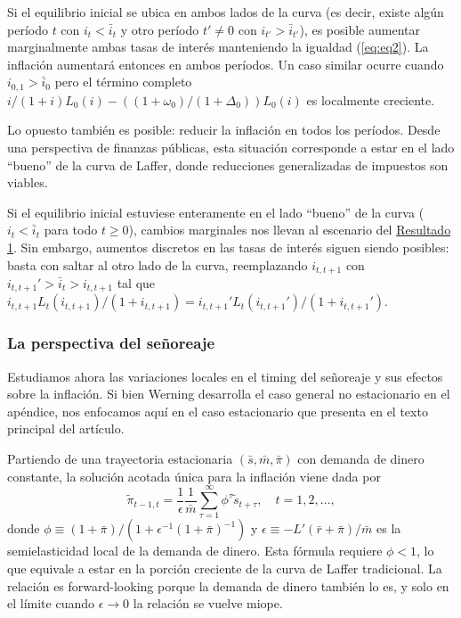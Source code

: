\documentclass[../../entrega.tex]{subfiles}
\begin{document}
Si el equilibrio inicial se ubica en ambos lados de la curva (es decir, existe algún período $t$ con $i_t < \bar{i}_t$ y otro período $t' \neq 0$ con $i_{t'} > \bar{i}_{t'}$), es posible aumentar marginalmente ambas tasas de interés manteniendo la igualdad (\ref{eq:eq2}).
La inflación aumentará entonces en ambos períodos.
Un caso similar ocurre cuando $i_{0,1} > \bar{i}_0$ pero el término completo $i/(1 + i)L_0(i) - ((1 + \omega_0)/(1 + \Delta_0))L_0(i)$ es localmente creciente.

Lo opuesto también es posible: reducir la inflación en todos los períodos.
Desde una perspectiva de finanzas públicas, esta situación corresponde a estar en el lado ``bueno'' de la curva de Laffer, donde reducciones generalizadas de impuestos son viables.

Si el equilibrio inicial estuviese enteramente en el lado ``bueno'' de la curva ($i_t < \bar{i}_t$ para todo $t \geq 0$), cambios marginales nos llevan al escenario del \hyperref[par:result1]{Resultado 1}.
Sin embargo, aumentos discretos en las tasas de interés siguen siendo posibles: basta con saltar al otro lado de la curva, reemplazando $i_{t,t+1}$ con $i_{t,t+1}' > \bar{i}_t > i_{t,t+1}$ tal que $i_{t,t+1}L_t(i_{t,t+1})/(1 + i_{t,t+1}) = i_{t,t+1}'L_t(i_{t,t+1}')/(1 + i_{t,t+1}')$.

\subsubsection{La perspectiva del señoreaje}
Estudiamos ahora las variaciones locales en el timing del señoreaje y sus efectos sobre la inflación.
Si bien Werning desarrolla el caso general no estacionario en el apéndice, nos enfocamos aquí en el caso estacionario que presenta en el texto principal del artículo.

Partiendo de una trayectoria estacionaria $(\bar{s}, \bar{m}, \bar{\pi})$ con demanda de dinero constante, la solución acotada única para la inflación viene dada por
\begin{equation}
    \tilde{\pi}_{t-1,t} = \frac{1}{\epsilon}\frac{1}{\bar{m}}\sum_{\tau=1}^{\infty}\phi^\tau\tilde{s}_{t+\tau}, \quad t = 1,2,\ldots,
\end{equation}
donde $\phi \equiv (1 + \bar{\pi})/(1 + \epsilon^{-1}(1 + \bar{\pi})^{-1})$ y $\epsilon \equiv -L'(\bar{r} + \bar{\pi})/\bar{m}$ es la semielasticidad local de la demanda de dinero.
Esta fórmula requiere $\phi < 1$, lo que equivale a estar en la porción creciente de la curva de Laffer tradicional.
La relación es forward-looking porque la demanda de dinero también lo es, y solo en el límite cuando $\epsilon \to 0$ la relación se vuelve miope.
\end{document}
